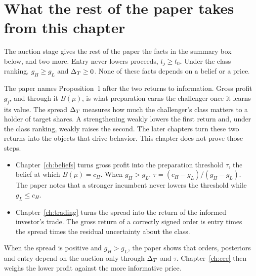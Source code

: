 \section{What the rest of the paper takes from this chapter}\label{sec:auction-uses}

The auction stage gives the rest of the paper the facts in the summary box below, and two more. Entry never
lowers proceeds, \(t_j\ge t_0\). Under the class ranking, \(g_H\ge g_L\) and \(\Delta_T\ge0\). None of these facts
depends on a belief or a price.

The paper names Proposition~1 after the two returns to information. Gross profit \(g_j\), and through it \(B(\mu)\),
is what preparation earns the challenger once it learns its value. The spread \(\Delta_T\) measures how much the
challenger's class matters to a holder of target shares. A strengthening weakly lowers the first return and, under
the class ranking, weakly raises the second. The later chapters turn these two returns into the objects that drive
behavior. This chapter does not prove those steps.
\begin{itemize}
\item Chapter~\ref{ch:beliefs} turns gross profit into the preparation threshold \(\tau\), the belief at which
\(B(\mu)=c_H\). When \(g_H>g_L\), \(\tau=(c_H-g_L)/(g_H-g_L)\). The paper notes that a stronger incumbent never
lowers the threshold while \(g_L\le c_H\).
\item Chapter~\ref{ch:trading} turns the spread into the return of the informed investor's trade. The gross return
of a correctly signed order is entry times the spread times the residual uncertainty about the class.
\end{itemize}
When the spread is positive and \(g_H>g_L\), the paper shows that orders, posteriors and entry depend on the
auction only through \(\Delta_T\) and \(\tau\). Chapter~\ref{ch:ccc} then weighs the lower profit against the more
informative price.

